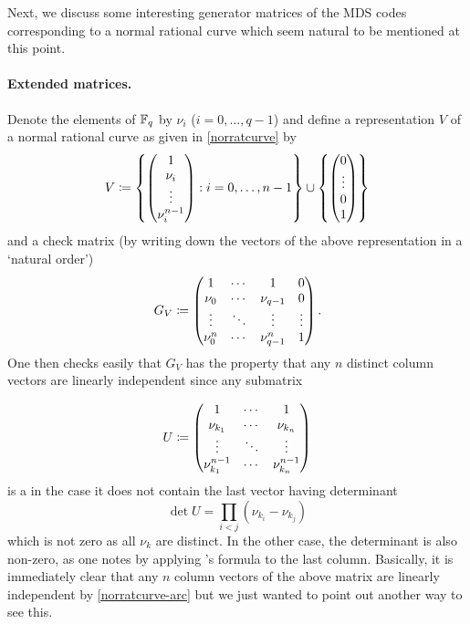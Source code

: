 Next, we discuss some interesting generator matrices of the MDS codes corresponding to a normal rational curve which seem natural to be mentioned at this point.

\paragraph{Extended  matrices.}
Denote the elements of $\mathbb{F}_{q}$ by $\nu_i$ ($i=0,\ldots,q-1$) and define a representation $V$ of a normal rational curve as given in \autoref{norratcurve} by
$$
V\defeq\set{\begin{pmatrix} 1 \\ \nu_i\\ \vdots\\ \nu_i^{n-1}\end{pmatrix}}[i=\range 0 {n-1}]\setjoin\set{
        \begin{pmatrix}
            0 \\
            \vdots \\
            0 \\
            1
        \end{pmatrix}
}
$$
and a check matrix (by writing down the vectors of the above representation in a `natural order')
$$
G_V\mathrel{\mathrel{\mathop:}\mkern-1.2mu=}
\begin{pmatrix}
    1      & \cdots & 1      & 0      \\
    \nu_0    & \cdots & \nu_{q-1}    & 0      \\
    \vdots & \ddots & \vdots & \vdots \\
    \nu_0^n  & \cdots & \nu_{q-1}^n  & 1
\end{pmatrix}\textrm{.}
$$
One then checks easily that $G_V$ has the property that any $n$ distinct column vectors are linearly independent since any submatrix

$$
U \mathrel{\mathrel{\mathop:}\mkern-1.2mu=}\begin{pmatrix}
    1             & \cdots & 1       \\
    \nu_{k_1}       & \cdots & \nu_{k_n} \\
    \vdots        & \ddots & \vdots  \\
    \nu_{k_1}^{n-1} & \cdots & \nu_{k_n}^{n-1} 
\end{pmatrix}
$$
is a  in the case it does not contain the last vector having determinant
$$
    \det U = \prod_{i<j}{(\nu_{k_i}-\nu_{k_j})}
$$%
which is not zero as all $\nu_k$ are distinct. In the other case, the determinant is also non-zero, as one notes by applying 's formula to the last column. Basically, it is immediately clear that any $n$ column vectors of the above matrix are linearly independent by \autoref{norratcurve-arc} but we just wanted to point out another way to see this.

